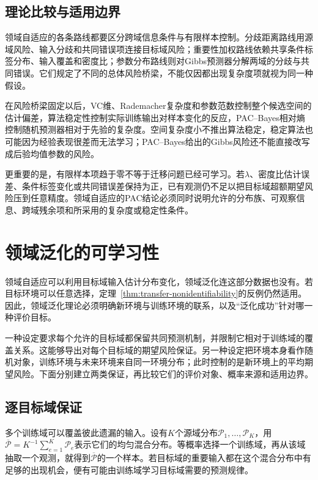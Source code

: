 \subsection{理论比较与适用边界}
\label{sec:adaptation-comparison}

领域自适应的各条路线都要区分跨域信息条件与有限样本控制。分歧距离路线用源域风险、输入分歧和共同错误项连接目标域风险；重要性加权路线依赖共享条件标签分布、输入覆盖和密度比；参数分布路线则对Gibbs预测器分解两域的分歧与共同错误。它们规定了不同的总体风险桥梁，不能仅因都出现复杂度项就视为同一种假设。

在风险桥梁固定以后，VC维、Rademacher复杂度和参数范数控制整个候选空间的估计偏差，算法稳定性控制实际训练输出对样本变化的反应，PAC--Bayes相对熵控制随机预测器相对于先验的复杂度。空间复杂度小不推出算法稳定，稳定算法也可能因为经验表现很差而无法学习；PAC--Bayes给出的Gibbs风险还不能直接改写成后验均值参数的风险。

更重要的是，有限样本项趋于零不等于迁移问题已经可学习。若$\lambda$、密度比估计误差、条件标签变化或共同错误差保持为正，已有观测仍不足以把目标域超额期望风险压到任意精度。领域自适应的PAC结论必须同时说明允许的分布族、可观察信息、跨域残余项和所采用的复杂度或稳定性条件。

\section{领域泛化的可学习性}
\label{sec:domain-generalization}

领域自适应可以利用目标域输入估计分布变化，领域泛化连这部分数据也没有。若目标环境可以任意选择，定理~\ref{thm:transfer-nonidentifiability}的反例仍然适用。因此，领域泛化理论必须明确新环境与训练环境的联系，以及“泛化成功”针对哪一种评价目标。

一种设定要求每个允许的目标域都保留共同预测机制，并限制它相对于训练域的覆盖关系。这能够导出对每个目标域的期望风险保证。另一种设定把环境本身看作随机对象，训练环境与未来环境来自同一环境分布；此时控制的是新环境上的平均期望风险。下面分别建立两类保证，再比较它们的评价对象、概率来源和适用边界。

\subsection{逐目标域保证}
\label{sec:dg-shared-mechanism}

多个训练域可以覆盖彼此遗漏的输入。设有$K$个源域分布$\mathcal P_1,\ldots,\mathcal P_K$，用
$\overline{\mathcal P}=K^{-1}\sum_{e=1}^K\mathcal P_e$表示它们的均匀混合分布。等概率选择一个训练域，再从该域抽取一个观测，就得到$\overline{\mathcal P}$的一个样本。若目标域的重要输入都在这个混合分布中有足够的出现机会，便有可能由训练域学习目标域需要的预测规律。

